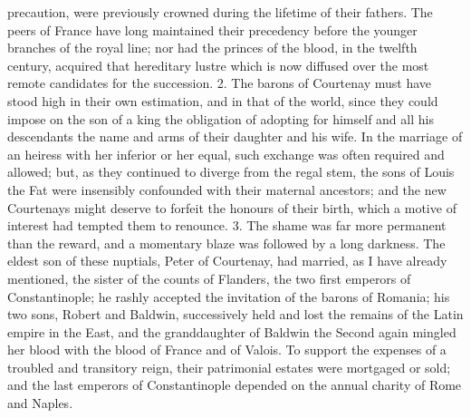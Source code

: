 precaution, were previously crowned during the lifetime of their fathers. The peers of France have long maintained their precedency before the younger branches of the royal line; nor had the princes of the blood, in the twelfth century, acquired that hereditary lustre which is now diffused over the most remote candidates for the succession. 2. The barons of Courtenay must have stood high in their own estimation, and in that of the world, since they could impose on the son of a king the obligation of adopting for himself and all his descendants the name and arms of their daughter and his wife. In the marriage of an heiress with her inferior or her equal, such exchange was often required and allowed; but, as they continued to diverge from the regal stem, the sons of Louis the Fat were insensibly confounded with their maternal ancestors; and the new Courtenays might deserve to forfeit the honours of their birth, which a motive of interest had tempted them to renounce. 3. The shame was far more permanent than the reward, and a momentary blaze was followed by a long darkness. The eldest son of these nuptials, Peter of Courtenay, had married, as I have already mentioned, the sister of the counts of Flanders, the two first emperors of Constantinople; he rashly accepted the invitation of the barons of Romania; his two sons, Robert and Baldwin, successively held and lost the remains of the Latin empire in the East, and the granddaughter of Baldwin the Second again mingled her blood with the blood of France and of Valois. To support the expenses of a troubled and transitory reign, their patrimonial estates were mortgaged or sold; and the last emperors of Constantinople depended on the annual charity of Rome and Naples.

